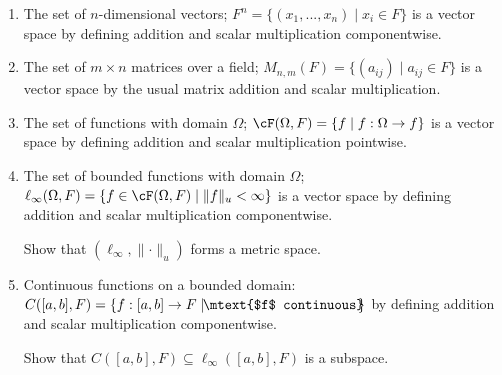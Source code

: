     \newpage
    \begin{example}
        \phantom{a}
        \begin{enumerate}[label = (\arabic*)]
            \item The set of $n$-dimensional vectors; $F^n = \{(x_1,...,x_n) \mid x_i \in F\}$ is a vector space by defining addition and scalar multiplication componentwise.
            
            \item The set of $m \times n$ matrices over a field; $M_{n,m}(F) = \{(a_{ij}) \mid a_{ij} \in F\}$ is a vector space by the usual matrix addition and scalar multiplication.
            
            \item The set of functions with domain $\Omega$;  $\cF(\Omega,F) = \{f \mid f:\Omega \rightarrow f\}$ is a vector space by defining addition and scalar multiplication pointwise.
            
            \item The set of bounded functions with domain $\Omega$; $\ell_\infty(\Omega,F) = \{f \in \cF(\Omega,F) \mid  \lVert f \rVert _u < \infty\}$ is a vector space by defining addition and scalar multiplication componentwise.
                \begin{exercise}\label{ex:bounded-met-space}
                    Show that $(\ell_\infty, \lVert \cdot \rVert _u)$ forms a metric space.
                \end{exercise}
            
            \item Continuous functions on a bounded domain: \newline$C([a,b], F) = \{f:[a,b] \rightarrow F \mid \hspace{-4pt}\mtext{$f$ continuous}\hspace{-4pt}\}$ by defining addition and scalar multiplication componentwise.
                \begin{exercise}\label{ex:cont-subspace}
                    Show that $C([a,b], F) \subseteq \ell_\infty([a,b],F)$ is a subspace.
                \end{exercise}


\end{enumerate}
\end{example}
